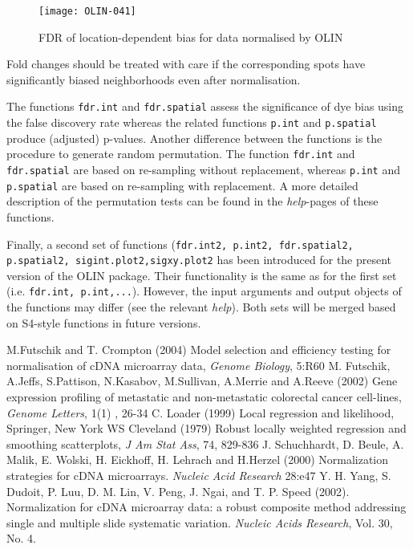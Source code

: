 \documentclass[a4paper,11pt]{article}
\begin{document}
\begin{figure}
\centering
\texttt{[image: OLIN-041]}
\caption{FDR of location-dependent bias for data normalised by OLIN}
\label{fdrspatialolin}
\end{figure}


 
Fold changes should be treated with care if the corresponding spots have significantly biased 
neighborhoods even after normalisation. 


The functions \texttt{fdr.int} and \texttt{fdr.spatial} assess the significance of dye bias using the false discovery
rate whereas the related  functions \texttt{p.int} and \texttt{p.spatial} produce (adjusted) p-values.
Another difference between the functions is the procedure to generate random permutation.
The function \texttt{fdr.int} and \texttt{fdr.spatial} are based on re-sampling without replacement,
whereas  \texttt{p.int} and \texttt{p.spatial} are based on re-sampling with replacement.  
A more detailed description of the permutation tests can be found in the \textit{help}-pages of these functions.

Finally, a second set of functions  (\texttt{fdr.int2, p.int2, fdr.spatial2, p.spatial2, sigint.plot2,sigxy.plot2} has been introduced for the present version of the OLIN package. Their functionality is the same as for the first set (i.e. \texttt{fdr.int, p.int,...}). However, the input arguments  and output objects of the functions  may differ (see the  relevant \textit{help}). Both sets will be merged based on S4-style functions in future versions.



\begin{thebibliography}{99}
 M.Futschik and T. Crompton (2004) Model selection and efficiency testing for normalisation of cDNA microarray data, \emph{Genome Biology}, 5:R60  
 M. Futschik, A.Jeffs, S.Pattison, N.Kasabov, M.Sullivan, A.Merrie and A.Reeve (2002) Gene expression profiling of metastatic and non-metastatic colorectal cancer cell-lines,  \emph{Genome Letters}, 1(1) , 26-34
 C. Loader (1999) Local regression and likelihood, Springer, New York
 WS Cleveland (1979) Robust locally weighted regression and smoothing scatterplots,
\emph{J Am Stat Ass}, 74, 829-836
 J. Schuchhardt, D. Beule, A. Malik, E. Wolski, H. Eickhoff, H. Lehrach and H.Herzel (2000)
Normalization strategies for cDNA microarrays. \emph{Nucleic Acid Research} 28:e47
 Y. H. Yang, S. Dudoit, P. Luu, D. M. Lin, V. Peng, J. Ngai, and T.
     P. Speed (2002). Normalization for cDNA microarray data: a robust
     composite method addressing single and multiple slide systematic
     variation. \emph{Nucleic Acids Research}, Vol. 30, No. 4.
 


\end{thebibliography}
\end{document}
